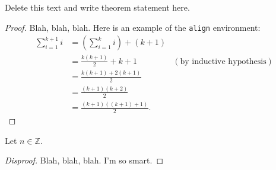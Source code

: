 \documentclass[12pt]{article}
\newcommand{\Z}{\mathbb{Z}}
\newenvironment{theorem}[2][Theorem]{\begin{trivlist}
    \item[\hskip \labelsep {\bfseries #1}\hskip \labelsep {\bfseries #2.}]}{\end{trivlist}}
\newenvironment{proposition}[2][Proposition]{\begin{trivlist}
    \item[\hskip \labelsep {\bfseries #1}\hskip \labelsep {\bfseries #2.}]}{\end{trivlist}}
\begin{document}
      
      
	  \begin{theorem}{x.yz} %
	  Delete this text and write theorem statement here.
	  \end{theorem}
	   
	   \begin{proof}
	   Blah, blah, blah.  Here is an example of the \texttt{align} environment:
	   \begin{align*}
	   \sum_{i=1}^{k+1}i & = \left(\sum_{i=1}^{k}i\right) +(k+1)\\ 
	   & = \frac{k(k+1)}{2}+k+1 & (\text{by inductive hypothesis})\\
	   & = \frac{k(k+1)+2(k+1)}{2}\\
	   & = \frac{(k+1)(k+2)}{2}\\
	   & = \frac{(k+1)((k+1)+1)}{2}.
	   \end{align*}
	   \end{proof}
	    
	    \begin{proposition}{x.yz}
	    Let $n\in \Z$.  
	    \end{proposition}
	     
	     \begin{proof}[Disproof]%
	     Blah, blah, blah.  I'm so smart.
	     \end{proof}
	      
	       
	       
\end{document}
